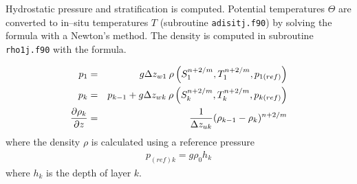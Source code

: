 Hydrostatic pressure and stratification is computed.
Potential temperatures $\Theta$ are converted to in--situ temperatures $T$ (subroutine \texttt{adisitj.f90})
by solving the \citet{Gill:1982} formula with a Newton's method.
The density is computed in subroutine \texttt{rho1j.f90} with the \citet{unesco83} formula.

\begin{eqnarray}
p_1 &=& g\Delta z_{w1}\: \rho\left(S_1^{n+2/m}, T_1^{n+2/m}, p_{1(ref)}\right)\\
p_k &=& p_{k-1} + g\Delta z_{wk}\: \rho\left(S_k^{n+2/m}, T_k^{n+2/m}, p_{k(ref)}\right)\\
{{\partial\rho_k}\over{\partial z}} &=& {1\over\Delta z_{uk}} (\rho_{k-1}-\rho_k)^{n+2/m}
\end{eqnarray}
where the density $\rho$ is calculated using a reference pressure
\begin{eqnarray}
p_{(ref)k}= g\rho_0 h_k
\end{eqnarray}
where $h_k$ is the  depth of layer $k$.

